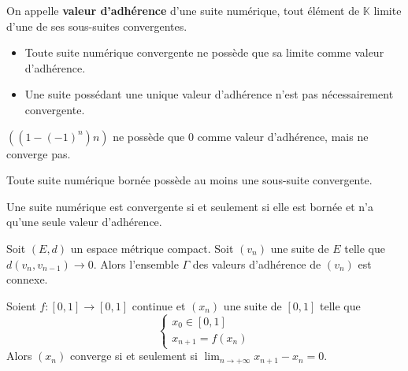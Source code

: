 	\begin{definition}
		On appelle \textbf{valeur d'adhérence} d'une suite numérique, tout élément de $\mathbb{K}$ limite d'une de ses sous-suites convergentes.
	\end{definition}

	\begin{remark}
		\begin{itemize}
			\item Toute suite numérique convergente ne possède que sa limite comme valeur d'adhérence.
			\item Une suite possédant une unique valeur d'adhérence n'est pas nécessairement convergente.
		\end{itemize}
	\end{remark}

	\begin{example}
		$((1 - (-1)^n)n)$ ne possède que $0$ comme valeur d'adhérence, mais ne converge pas.
	\end{example}


	\begin{theorem}
		Toute suite numérique bornée possède au moins une sous-suite convergente.
	\end{theorem}


	\begin{proposition}
		Une suite numérique est convergente si et seulement si elle est bornée et n'a qu'une seule valeur d'adhérence.
	\end{proposition}


	\begin{application}
		Soit $(E, d)$ un espace métrique compact. Soit $(v_n)$ une suite de $E$ telle que $d(v_n,v_{n-1}) \longrightarrow 0$. Alors l'ensemble $\Gamma$ des valeurs d'adhérence de $(v_n)$ est connexe.
	\end{application}

	\begin{corollary}
		Soient $f : [0, 1] \rightarrow [0, 1]$ continue et $(x_n)$ une suite de $[0, 1]$ telle que
		\[ \begin{cases} x_0 \in [0, 1] \\ x_{n+1} = f(x_n) \end{cases} \]
		Alors $(x_n)$ converge si et seulement si $\lim_{n \rightarrow +\infty } x_{n+1} - x_n = 0$.
	\end{corollary}

